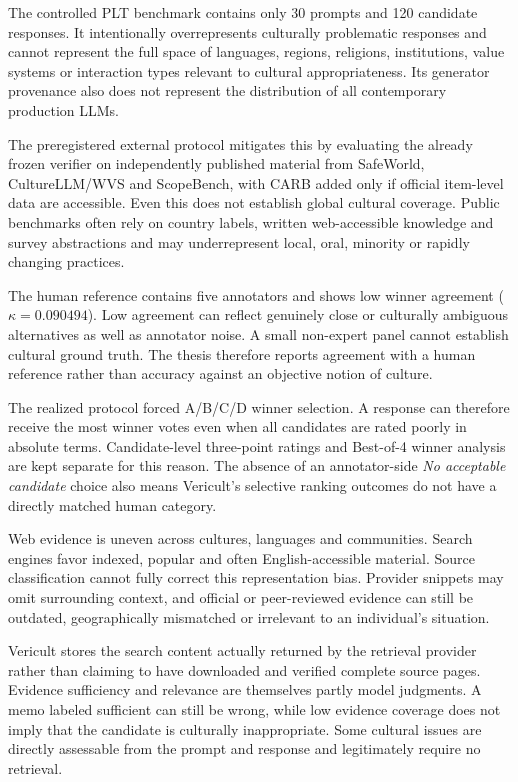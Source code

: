 The controlled PLT benchmark contains only 30 prompts and 120 candidate responses. It intentionally overrepresents culturally problematic responses and cannot represent the full space of languages, regions, religions, institutions, value systems or interaction types relevant to cultural appropriateness. Its generator provenance also does not represent the distribution of all contemporary production LLMs.

The preregistered external protocol mitigates this by evaluating the already frozen verifier on independently published material from SafeWorld, CultureLLM/WVS and ScopeBench, with CARB added only if official item-level data are accessible. Even this does not establish global cultural coverage. Public benchmarks often rely on country labels, written web-accessible knowledge and survey abstractions and may underrepresent local, oral, minority or rapidly changing practices.

The human reference contains five annotators and shows low winner agreement ($\kappa=0.090494$). Low agreement can reflect genuinely close or culturally ambiguous alternatives as well as annotator noise. A small non-expert panel cannot establish cultural ground truth. The thesis therefore reports agreement with a human reference rather than accuracy against an objective notion of culture.

The realized protocol forced A/B/C/D winner selection. A response can therefore receive the most winner votes even when all candidates are rated poorly in absolute terms. Candidate-level three-point ratings and Best-of-4 winner analysis are kept separate for this reason. The absence of an annotator-side \emph{No acceptable candidate} choice also means Vericult's selective ranking outcomes do not have a directly matched human category.

Web evidence is uneven across cultures, languages and communities. Search engines favor indexed, popular and often English-accessible material. Source classification cannot fully correct this representation bias. Provider snippets may omit surrounding context, and official or peer-reviewed evidence can still be outdated, geographically mismatched or irrelevant to an individual's situation.

Vericult stores the search content actually returned by the retrieval provider rather than claiming to have downloaded and verified complete source pages. Evidence sufficiency and relevance are themselves partly model judgments. A memo labeled sufficient can still be wrong, while low evidence coverage does not imply that the candidate is culturally inappropriate. Some cultural issues are directly assessable from the prompt and response and legitimately require no retrieval.

